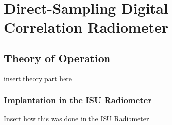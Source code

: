 \chapter{Direct-Sampling Digital Correlation Radiometer}

\section*{Theory of Operation}

insert theory part here

\subsection{Implantation in the ISU Radiometer}
Insert how this was done in the ISU Radiometer
